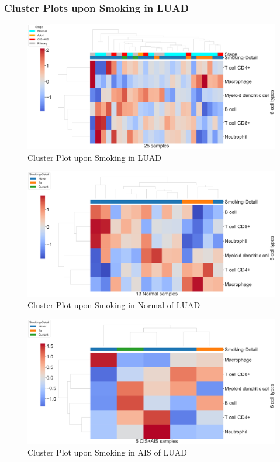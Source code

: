 \documentclass{beamer}
\begin{document}
    \begin{frame}[allowframebreaks]
        \frametitle{Cluster Plots upon Smoking in LUAD}

        \begin{figure}
            \includegraphics[width=0.9 \linewidth]{figures/TIMER/Clustermap/STAR.FPKM.ADC.Smoking/TIMER-All.pdf}
            \caption{Cluster Plot upon Smoking in LUAD}
        \end{figure}

        \begin{figure}
            \includegraphics[width=0.9 \linewidth]{figures/TIMER/Clustermap/STAR.FPKM.ADC.Smoking/TIMER-Normal.pdf}
            \caption{Cluster Plot upon Smoking in Normal of LUAD}
        \end{figure}

        \begin{figure}
            \includegraphics[width=0.9 \linewidth]{figures/TIMER/Clustermap/STAR.FPKM.ADC.Smoking/TIMER-CIS+AIS.pdf}
            \caption{Cluster Plot upon Smoking in AIS of LUAD}
        \end{figure}


\end{frame}
\end{document}
